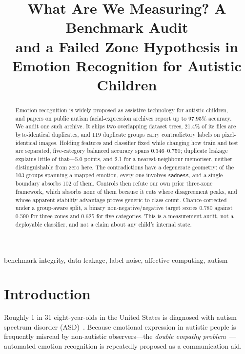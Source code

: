 \documentclass[conference,10pt]{IEEEtran}
\title{What Are We Measuring? A Benchmark Audit\\
and a Failed Zone Hypothesis in\\
Emotion Recognition for Autistic Children}
\author{\IEEEauthorblockN{Nikhil Mahesh}\IEEEauthorblockA{Pioneer Research}}
\begin{document}
\setlength{\textfloatsep}{7pt plus 2pt minus 2pt}
\setlength{\floatsep}{6pt plus 2pt minus 2pt}
\setlength{\intextsep}{6pt plus 2pt minus 2pt}
\maketitle

\begin{abstract}
Emotion recognition is widely proposed as assistive technology for autistic
children, and papers on public autism facial-expression archives report up to
97.95\% accuracy. We audit one such archive. It ships two overlapping dataset
trees, 21.4\% of its files are byte-identical duplicates, and 119 duplicate
groups carry contradictory labels on pixel-identical images. Holding features
and classifier fixed while changing how train and test are separated,
five-category balanced accuracy spans 0.346--0.750; duplicate leakage explains
little of that---5.0 points, and 2.1 for a nearest-neighbour memoriser, neither
distinguishable from zero here. The contradictions have a degenerate geometry:
of the 103 groups spanning a mapped emotion, every one involves
\texttt{sadness}, and a single boundary absorbs 102 of them.
Controls then refute our own prior three-zone framework, which absorbs none of
them because it cuts where disagreement peaks, and whose apparent stability
advantage proves generic to class count. Chance-corrected under a group-aware
split, a binary non-negative/negative target scores 0.780 against 0.590 for
three zones and 0.625 for five categories. This is a measurement audit, not a
deployable classifier, and not a claim about any child's internal state.
\end{abstract}

\begin{IEEEkeywords}
benchmark integrity, data leakage, label noise, affective computing, autism
\end{IEEEkeywords}

\section{Introduction}
Roughly 1 in 31 eight-year-olds in the United States is diagnosed with autism
spectrum disorder (ASD)~\cite{shaw2025}. Because emotional expression in
autistic people is frequently misread by non-autistic observers---the
\emph{double empathy problem}~\cite{milton2012}---automated emotion recognition is
repeatedly proposed as a communication aid.
\end{document}
